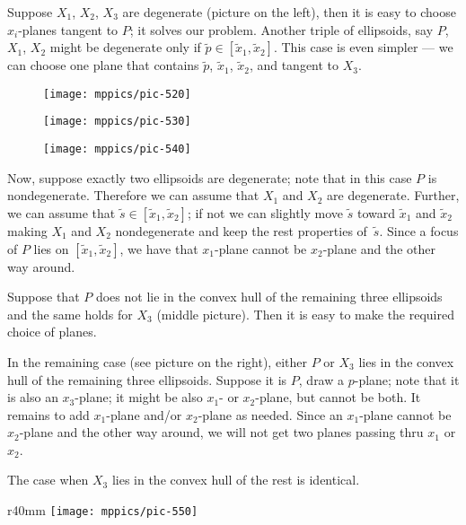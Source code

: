 \documentclass{article}
\begin{document}
Suppose $X_1$, $X_2$, $X_3$ are degenerate (picture on the left), then it is easy to choose $x_i$-planes tangent to $P$; it solves our problem.
Another triple of ellipsoids, say $P$, $X_1$, $X_2$ might be degenerate only if $\tilde p\in[\tilde x_1,\tilde x_2]$.
This case is even simpler --- we can choose one plane that contains $\tilde p$, $\tilde x_1$, $\tilde x_2$, and tangent to $X_3$.

\begin{figure}[!ht]
\begin{minipage}{.3\textwidth}
\centering
\texttt{[image: mppics/pic-520]}
\end{minipage}
\hfill
\begin{minipage}{.3\textwidth}
\centering
\texttt{[image: mppics/pic-530]}
\end{minipage}
\hfill
\begin{minipage}{.3\textwidth}
\centering
\texttt{[image: mppics/pic-540]}
\end{minipage}
\end{figure}

Now, suppose exactly two ellipsoids are degenerate; note that in this case $P$ is nondegenerate.
Therefore we can assume that $X_1$ and $X_2$ are degenerate.
Further, we can assume that $\tilde s\in[\tilde x_1,\tilde x_2]$;
if not we can slightly move $\tilde s$ toward $\tilde x_1$ and $\tilde x_2$ making $X_1$ and $X_2$ nondegenerate and keep the rest properties of~$\tilde s$.
Since a focus of $P$ lies on $[\tilde x_1,\tilde x_2]$, we have that $x_1$-plane cannot be $x_2$-plane and the other way around.

Suppose that $P$ does not lie in the convex hull of the remaining three ellipsoids
and the same holds for $X_3$ (middle picture).
Then it is easy to make the required choice of planes.

In the remaining case (see picture on the right), either $P$ or $X_3$ lies in the convex hull of the remaining three ellipsoids.
Suppose it is $P$, draw a $p$-plane; note that it is also an $x_3$-plane;
it might be also $x_1$- or $x_2$-plane, but cannot be both.
It remains to add $x_1$-plane and/or $x_2$-plane as needed.
Since an $x_1$-plane cannot be $x_2$-plane and the other way around, we will not get two planes passing thru $x_1$ or $x_2$.

The case when $X_3$ lies in the convex hull of the rest is identical.

\begin{wrapfigure}{r}{40mm}
\vskip-0mm
\centering
\texttt{[image: mppics/pic-550]}
\end{wrapfigure}
\end{document}
